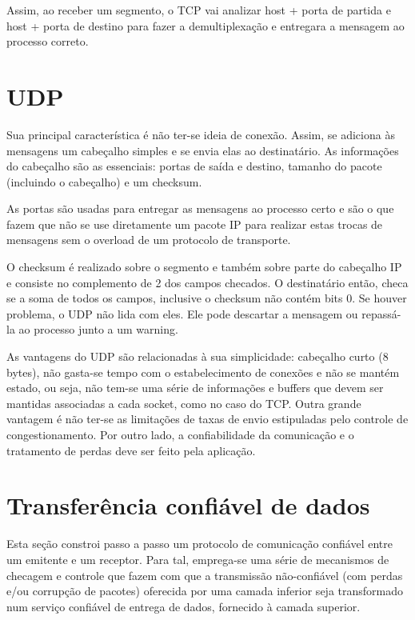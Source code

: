 Assim, ao receber um segmento, o TCP vai analizar host + porta de partida e host + porta de destino para fazer a demultiplexação e entregara a mensagem ao processo correto.

\section{UDP}

Sua principal característica é não ter-se ideia de conexão. 
Assim, se adiciona às mensagens um cabeçalho simples e se envia elas ao destinatário.
As informações do cabeçalho são as essenciais: portas de saída e destino, tamanho do pacote (incluindo o cabeçalho) e um checksum.

As portas são usadas para entregar as mensagens ao processo certo e são o que fazem que não se use diretamente um pacote IP para realizar estas trocas de mensagens sem o overload de um protocolo de transporte.

O checksum é realizado sobre o segmento e também sobre parte do cabeçalho IP e consiste no complemento de 2 dos campos checados.
O destinatário então, checa se a soma de todos os campos, inclusive o checksum não contém bits 0.
Se houver problema, o UDP não lida com eles. Ele pode descartar a mensagem ou repassá-la ao processo junto a um warning.

As vantagens do UDP são relacionadas à sua simplicidade: cabeçalho curto (8 bytes), não gasta-se tempo com o estabelecimento de conexões e não se mantém estado, ou seja, não tem-se uma série de informações e buffers que devem ser mantidas associadas a cada socket, como no caso do TCP.
Outra grande vantagem é não ter-se as limitações de taxas de envio estipuladas pelo controle de congestionamento.
Por outro lado, a confiabilidade da comunicação e o tratamento de perdas deve ser feito pela aplicação.

\section{Transferência confiável de dados}

Esta seção constroi passo a passo um protocolo de comunicação confiável entre um emitente e um receptor.
Para tal, emprega-se uma série de mecanismos de checagem e controle que fazem com que a transmissão não-confiável (com perdas e/ou corrupção de pacotes) oferecida por uma camada inferior seja transformado num serviço confiável de entrega de dados, fornecido à camada superior.

